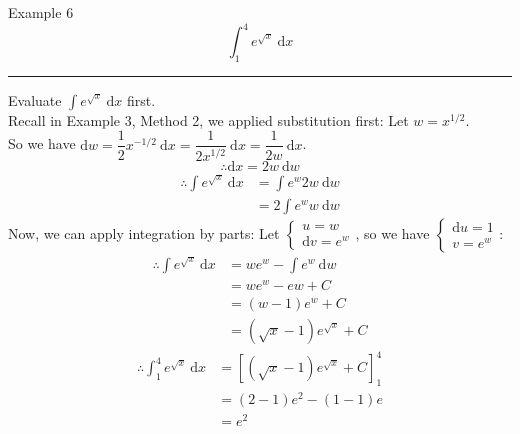 \documentclass[12pt,a4paper]{article}
\def\d{{\mathrm{d}}}
\begin{document}
\begin{eg}{Example 6}
	$$\int_1^4e^{\sqrt{x}}\ \d x$$
	\noindent\rule[0.25\baselineskip]{\textwidth}{1pt}
	Evaluate $\displaystyle\int e^{\sqrt{x}}\ \d x$ first. \\
	Recall in Example 3, Method 2, we applied substitution first: Let $w=x^{1/2}$.\\
	So we have $\d w=\dfrac{1}{2}x^{-1/2}\ \d x=\dfrac{1}{2x^{1/2}}\ \d x=\dfrac{1}{2w}\ \d x$. 
	$$\therefore\d x=2w\ \d w$$
	$$\begin{aligned}
		\therefore\int e^{\sqrt{x}}\ \d x&=\int e^{w}2w\ \d w\\
		&=2\int e^{w}w\ \d w
	\end{aligned}$$
	Now, we can apply integration by parts: Let $\begin{cases}u=w\\\d v=e^{w}\end{cases}$, so we have $\begin{cases}\d u=1\\v=e^{w}\end{cases}$:
	$$\begin{aligned}
		\therefore \int e^{\sqrt{x}}\ \d x&=we^{w}-\int e^{w}\ \d w\\
		&=we^{w}-e{w}+C\\
		&=(w-1)e^{w}+C\\
		&=(\sqrt{x}-1)e^{\sqrt{x}}+C
	\end{aligned}$$
	$$\begin{aligned}
		\therefore\int_1^4 e^{\sqrt{x}}\ \d x&=\left[(\sqrt{x}-1)e^{\sqrt{x}}+C\right]_1^4\\
		&=(2-1)e^2-(1-1)e\\
		&=e^2
	\end{aligned}$$
\end{eg}
\end{document}
